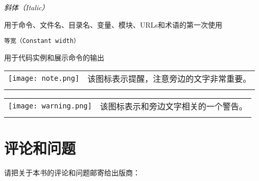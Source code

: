 \textit{斜体（Italic）}
\begin{adjustwidth}{4em}{0cm}
用于命令、文件名、目录名、变量、模块、URLs和术语的第一次使用
\end{adjustwidth}

\texttt{等宽（Constant width）}
\begin{adjustwidth}{4em}{0cm}
用于代码实例和展示命令的输出
\end{adjustwidth}




\begin{table}[h]
  \begin{center}
    \begin{tabu} to 0.85\linewidth {|X[1,r,m]X[15,l,m]|}
      \tabucline{-}
      \texttt{[image: note.png]} & 该图标表示提醒，注意旁边的文字非常重要。\\
      \tabucline{-}
    \end{tabu}
  \end{center}
\end{table}
\vspace{-25pt}

\begin{table}[h]
  \begin{center}
    \begin{tabu} to 0.85\linewidth {|X[1,r,m]X[15,l,m]|}
      \tabucline{-}
      \texttt{[image: warning.png]} & 该图标表示和旁边文字相关的一个警告。\\
      \tabucline{-}
    \end{tabu}
  \end{center}
\end{table}
\vspace{-25pt}

\section*{评论和问题}
请把关于本书的评论和问题邮寄给出版商：

